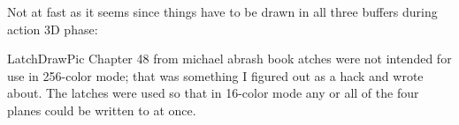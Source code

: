 Not at fast as it seems since things have to be drawn in all three buffers during action 3D phase:\\
\par

\begin{minipage}{\textwidth}

\end{minipage}


LatchDrawPic
Chapter 48 from michael abrash book
atches were not intended for use in 256-color mode; that was something I figured out as a hack and wrote about. The latches were used so that in 16-color mode any or all of the four planes could be written to at once.

